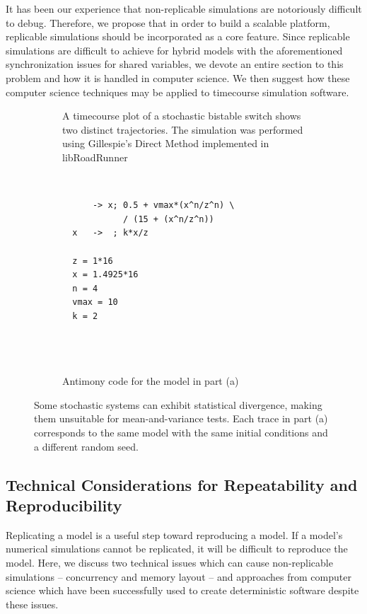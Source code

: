 \documentclass[journal,transmag,twoside]{IEEEtran}
\begin{document}
It has been our experience that non-replicable simulations are notoriously difficult to debug. Therefore, we propose that in order to build a scalable platform, replicable simulations should be incorporated as a core feature. Since replicable simulations are difficult to achieve for hybrid models with the aforementioned synchronization issues for shared variables, we devote an entire section to this problem and how it is handled in computer science. We then suggest how these computer science techniques may be applied to timecourse simulation software.

\begin{figure}[!t]
  \centering
  \begin{subfigure}[t]{0.5\textwidth}
    \centering
    
    \caption{A timecourse plot of a stochastic bistable switch shows two distinct trajectories. The simulation was performed using Gillespie's Direct Method \cite{gillespie1977exact} implemented in libRoadRunner \cite{Somogyi17062015}}
  \end{subfigure}%
  ~
  \begin{subfigure}[t]{0.5\textwidth}
    \centering
    \begin{BVerbatim}
      -> x; 0.5 + vmax*(x^n/z^n) \
            / (15 + (x^n/z^n))
  x   ->  ; k*x/z

  z = 1*16
  x = 1.4925*16
  n = 4
  vmax = 10
  k = 2




    \end{BVerbatim}
    \caption{Antimony code for the model in part (a)}
  \end{subfigure}
  \caption{Some stochastic systems can exhibit statistical divergence, making them unsuitable for mean-and-variance tests. Each trace in part (a) corresponds to the same model with the same initial conditions and a different random seed.}
  \label{fig_bistable_plot}
\end{figure}

\subsection{Technical Considerations for Repeatability and Reproducibility}

Replicating a model is a useful step toward reproducing a model.
If a model's numerical simulations cannot be replicated, it will be
difficult to reproduce the model. Here, we discuss two technical issues which can 
cause non-replicable simulations -- concurrency and memory layout -- 
and approaches from computer science which have been successfully used to create 
deterministic software despite these issues.
\end{document}
